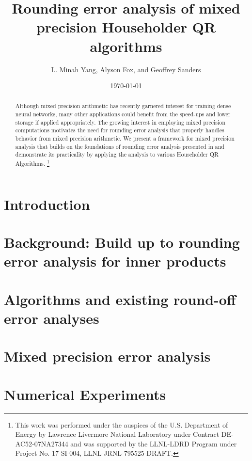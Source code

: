 \documentclass[review,onefignum,onetabnum]{siamart190516}
\title{Rounding error analysis of mixed precision Householder QR algorithms}
\author{L. Minah Yang, Alyson Fox, and Geoffrey Sanders}
\date{\today}
\newcommand\blfootnote[1]{%
	\begingroup
	\renewcommand\thefootnote{}\footnote{#1}%
	\addtocounter{footnote}{-1}%
	\endgroup
}
\begin{document}
\maketitle
\begin{abstract}
	Although mixed precision arithmetic has recently garnered interest for training dense neural networks, many other applications could benefit from the  speed-ups and lower storage if applied appropriately. 
	The growing interest in employing mixed precision computations motivates the need for rounding error analysis that properly handles behavior from mixed precision arithmetic.
	We present a framework for mixed precision analysis that builds on the foundations of rounding error analysis presented in \cite{Higham2002} and demonstrate its practicality by applying the analysis to various Householder QR Algorithms. 
	\blfootnote{This work was performed under the auspices of the U.S. Department of Energy by Lawrence Livermore National Laboratory under Contract DE-AC52-07NA27344 and was supported by the LLNL-LDRD Program under Project No. 17-SI-004, LLNL-JRNL-795525-DRAFT.}
\end{abstract}
\section{Introduction}\label{sec:intro}

\section{Background: Build up to rounding error analysis for inner products}\label{sec:background}

\section{Algorithms and existing round-off error analyses}\label{sec:algo}

\section{Mixed precision error analysis}\label{sec:mpanalysis}

\section{Numerical Experiments}\label{sec:NE}

%
%
%
%
%
\end{document}
